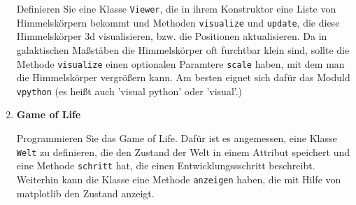 \begin{enumerate}[1.]
Definieren Sie eine Klasse \texttt{Viewer}, die
in ihrem Konstruktor eine Liste von Himmelskörpern
bekommt und Methoden \texttt{visualize}
und \texttt{update}, die diese Himmelskörper 3d visualisieren,
bzw. die Positionen aktualisieren.
Da in galaktischen Maßstäben die Himmelskörper oft furchtbar
klein sind, sollte die Methode \texttt{visualize} einen 
optionalen Paramtere \texttt{scale} haben, mit dem
man die Himmelskörper vergrößern kann. Am besten eignet
sich dafür das Moduld \texttt{vpython} (es heißt auch
'visual python' oder 'visual'.)
\item \textbf{Game of Life}

Programmieren Sie das Game of Life. Dafür ist es
angemessen, eine Klasse \texttt{Welt}  zu definieren, die den Zustand 
der Welt in einem Attribut speichert und eine Methode \texttt{schritt} hat, 
die einen Entwicklungssschritt beschreibt. Weiterhin kann die
Klasse eine Methode \texttt{anzeigen} haben, die mit Hilfe von
matplotlib den Zustand anzeigt.

\end{enumerate}
